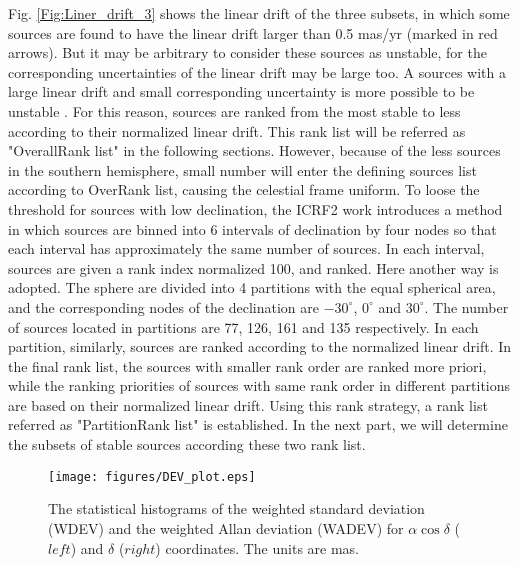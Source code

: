 \documentclass{aa}
\begin{document}
Fig. \ref{Fig:Liner_drift_3} shows the linear drift of the three subsets, in which some sources are found to have the linear drift larger than 0.5 mas/yr (marked in red arrows). But it may be arbitrary to consider these sources as unstable, for  the corresponding uncertainties of the linear drift may be large too. A sources with a large linear drift and small corresponding uncertainty is more possible to be unstable \citep{Lambert2009}. For this reason, sources are ranked from the most stable to less according to their normalized linear drift. This rank list will be referred as "OverallRank list" in the following sections. However, because of the less sources in the southern hemisphere, small number will enter the defining sources list according to OverRank list, causing the celestial frame uniform. To loose the threshold for sources with low declination, the ICRF2 work introduces a method in which sources are binned into 6 intervals of declination by four nodes so that each interval has approximately the same number of sources. In each interval, sources are given a rank index normalized 100, and ranked. Here another way is adopted. The sphere are divided into 4 partitions with the equal spherical area, and the corresponding nodes of the declination are $-30^{\circ}$, $0^{\circ}$ and $30^{\circ}$. The number of sources located in partitions are 77, 126, 161 and 135 respectively. In each partition, similarly, sources are ranked according to the normalized linear drift. In the final rank list, the sources with smaller rank order are ranked more priori, while the ranking priorities of sources with same rank order in different partitions are based on their normalized linear drift. Using this rank strategy, a rank list referred as "PartitionRank list" is established. In the next part, we will determine the subsets of stable sources according these two rank list.

\begin{figure}
   \centering
   \texttt{[image: figures/DEV\_plot.eps]}
      \caption{
      The statistical histograms of the weighted standard deviation (WDEV) and the weighted Allan deviation (WADEV) for $\alpha\cos\delta$ ($left$) and $\delta$ ($right$) coordinates. The units are mas.
              }
         \label{Fig:Dev}
\end{figure}

\begin{figure*}
   \centering
      \caption{
      Linear drift of three sets of sources selected in previous works. The red arrows indicate the corresponding values are larger than 500 $\mu as\cdot yr^{-1}$.
              }
         \label{Fig:Liner_drift_3}
   \end{figure*}
%
\end{document}

